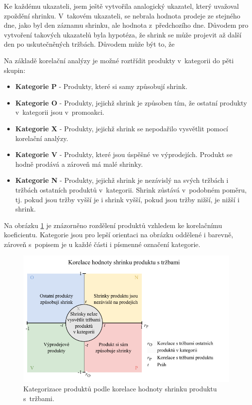 Ke každému ukazateli, jsem ještě vytvořila analogický ukazatel, který uvažoval zpoždění shrinku. V~takovém ukazateli, se nebrala hodnota prodeje ze stejného dne, jako byl den záznamu shrinku, ale hodnota z~předchozího dne. Důvodem pro vytvoření takových ukazatelů byla hypotéza, že shrink se může projevit až další den po uskutečněných tržbách. Důvodem může být to, že 

Na základě korelační analýzy je možné roztřídit produkty v~kategorii do pěti skupin:
\begin{itemize}
    \itemsep0em 
    \item[] \textbf{Kategorie P} - Produkty, které si samy způsobují shrink.
    \item[] \textbf{Kategorie O} - Produkty, jejichž shrink je způsoben tím, že ostatní produkty v~kategorii jsou v~promoakci.
    \item[] \textbf{Kategorie X} - Produkty, jejichž shrink se nepodařilo vysvětlit pomocí korelační analýzy.
    \item[] \textbf{Kategorie V} - Produkty, které jsou úspěšné ve výprodejích. Produkt se hodně prodává a zároveň má malé shrinky.
    \item[] \textbf{Kategorie N} - Produkty, jejichž shrink je nezávislý na svých tržbách i tržbách ostatních produktů v~kategorii. Shrink zůstává v~podobném poměru, tj. pokud jsou tržby vyšší je i shrink vyšší, pokud jsou tržby nižší, je nižší i shrink.
\end{itemize}

Na obrázku \ref*{obr:ctg:g:kategorizace1} je znázorněno rozdělení produktů vzhledem ke korelačnímu koeficientu. Kategorie jsou pro lepší orientaci na obrázku oddělené i barevně, zároveň s~popisem je u každé části i písmenné označení kategorie. 

\begin{figure}[hbtp!]
    \centering
    \captionsetup{justification=centering}
    \includegraphics[width=\textwidth]{obrazky/grafy/matice_korelace_typy_DP_colored.pdf}
    \caption{Kategorizace produktů podle korelace hodnoty shrinku produktu s~tržbami.}
    \label{obr:ctg:g:kategorizace1}
\end{figure}

